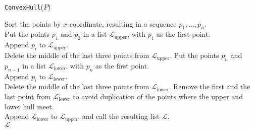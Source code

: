 \begin{algorithm}[H]
    \renewcommand{\thealgocf}{}
    \caption{\texttt{ConvexHull}($P$)}
    Sort the points by $x$-coordinate, resulting in a sequence $p_1,...,p_n$. \\
    Put the points $p_1$ and $p_2$ in a list $\mathcal{L}_{\mathrm{upper}}$, with $p_1$ as the first point. \\
    {            
        Append $p_i$ to $\mathcal{L}_{\mathrm{upper}}$. \\
        {
            Delete the middle of the last three points from $\mathcal{L}_{\mathrm{upper}}$.
        }
    }
    Put the points $p_n$ and $p_{n−1}$ in a list $\mathcal{L}_{\mathrm{lower}}$, with $p_n$ as the first point. \\
    {            
        Append $p_i$ to $\mathcal{L}_{\mathrm{lower}}$. \\
        {
            Delete the middle of the last three points from $\mathcal{L}_{\mathrm{lower}}$.
        }
    }
    Remove the first and the last point from $\mathcal{L}_{\mathrm{lower}}$ to avoid duplication of the points where the upper and lower hull meet. \\
    Append $\mathcal{L}_{\mathrm{lower}}$ to $\mathcal{L}_{\mathrm{upper}}$, and call the resulting list $\mathcal{L}$. \\
    \Return $\mathcal{L}$
\end{algorithm}